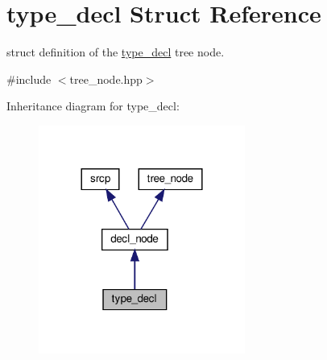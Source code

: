 \hypertarget{structtype__decl}{}\section{type\+\_\+decl Struct Reference}
\label{structtype__decl}


struct definition of the \hyperlink{structtype__decl}{type\+\_\+decl} tree node.  




{\ttfamily \#include $<$tree\+\_\+node.\+hpp$>$}



Inheritance diagram for type\+\_\+decl\+:
\nopagebreak
\begin{figure}[H]
\begin{center}
\leavevmode
\includegraphics[width=192pt]{d9/dd4/structtype__decl__inherit__graph}
\end{center}
\end{figure}


